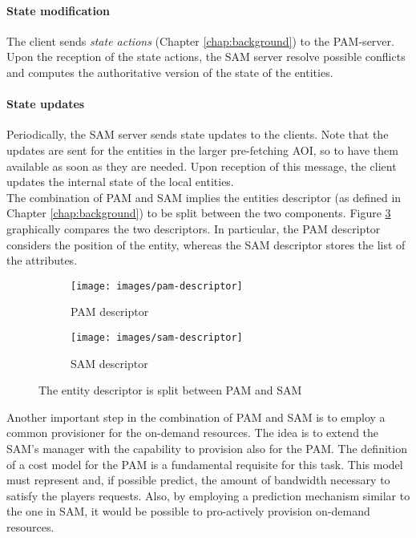 \documentclass[final,10pt,a5paper]{phdimt}
\theoremstyle{definition}
\begin{document}
\paragraph{State modification}
The client sends \textit{state actions} (Chapter \ref{chap:background}) to the PAM-server. Upon the reception of the state actions, the SAM server resolve possible conflicts and computes the authoritative version of the state of the entities. 

\paragraph{State updates}
Periodically, the SAM server sends state updates to the clients. Note that the updates are sent for the entities in the larger pre-fetching AOI, so to have them available as soon as they are needed. Upon reception of this message, the client updates the internal state of the local entities.\\






The combination of PAM and SAM implies the entities descriptor (as defined in Chapter \ref{chap:background}) to be split between the two components. Figure \ref{fig:sam-pam-desc} graphically compares the two descriptors. In particular, the PAM descriptor considers the position of the entity, whereas the SAM descriptor stores the list of the attributes.


\begin{figure}[tbh]
        \centering
        \begin{subfigure}[b]{0.45\textwidth}
                \centering
                \texttt{[image: images/pam-descriptor]}
                \caption{PAM descriptor}
                \label{fig:pam-descriptor}
        \end{subfigure}\quad
        \begin{subfigure}[b]{0.45\textwidth}
                \centering
                \texttt{[image: images/sam-descriptor]}
                \caption{SAM descriptor}
                \label{fig:sam-descriptor}
        \end{subfigure}
        \caption{The entity descriptor is split between PAM and SAM}\label{fig:sam-pam-desc}
\end{figure}



Another important step in the combination of PAM and SAM is to employ a common provisioner for the on-demand resources.
The idea is to extend the SAM's manager with the capability to provision also for the PAM.
The definition of a cost model for the PAM is a fundamental requisite for this task.
This model must represent and, if possible predict, the amount of bandwidth necessary to satisfy the players requests.
Also, by employing a prediction mechanism similar to the one in SAM, it would be possible to pro-actively provision on-demand resources.
\end{document}
